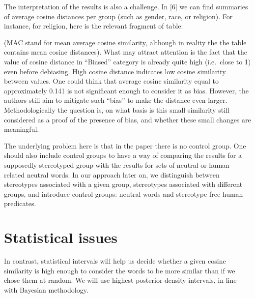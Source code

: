 \documentclass[
  10pt,
  dvipsnames,enabledeprecatedfontcommands, twocolumn]{scrartcl}
\begin{document}
The interpretation of the results is also a challenge. In {[}6{]} we can
find summaries of average cosine distances per group (such as gender,
race, or religion). For instance, for religion, here is the relevant
fragment of table:


\noindent (MAC stand for mean average cosine similarity, although in
reality the the table contains mean cosine distances). What may attract
attention is the fact that the value of cosine distance in ``Biased''
category is already quite high (i.e.~close to 1) even before debiasing.
High cosine distance indicates low cosine similarity between values. One
could think that average cosine similarity equal to approximately 0.141
is not significant enough to consider it as bias. However, the authors
still aim to mitigate such ``bias'' to make the distance even larger.
Methodologically the question is, on what basis is this small similarity
still considered as a proof of the presence of bias, and whether these
small changes are meaningful.

The underlying problem here is that in the paper there is no control
group. One should also include control groups to have a way of comparing
the results for a supposedly stereotyped group with the results for sets
of neutral or human-related neutral words. In our approach later on, we
distinguish between stereotypes associated with a given group,
stereotypes associated with different groups, and introduce control
groups: neutral words and stereotype-free human predicates.




\hypertarget{statistical-issues}{%
\section{Statistical issues}\label{statistical-issues}}

In contrast, statistical intervals will help us decide whether a given
cosine similarity is high enough to consider the words to be more
similar than if we chose them at random. We will use highest posterior
density intervals, in line with Bayesian methodology.
\end{document}
